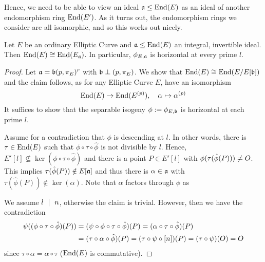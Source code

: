 Hence, we need to be able to view an ideal $\mathfrak{a} \leq \mathrm{End}(E)$ as an ideal of another endomorphism ring $\mathrm{End}(E')$.
As it turns out, the endomorphism rings we consider are all isomorphic, and so this works out nicely. 
\begin{lemma}
    Let $E$ be an ordinary Elliptic Curve and $\mathfrak{a} \leq \mathrm{End}(E)$ an integral, invertible ideal.
    Then $\mathrm{End}(E) \cong \mathrm{End}(E_{\mathfrak{a}})$.
    In particular, $\phi_{E, \mathfrak{a}}$ is horizontal at every prime $l$.
\end{lemma}
\begin{proof}
    Let $\mathfrak{a} = \mathfrak{b}(p, \pi_E)^r$ with $\mathfrak{b} \perp (p, \pi_E)$.
    We show that $\mathrm{End}(E) \cong \mathrm{End}(E/E[\mathfrak{b}])$ and the claim follows, as for any Elliptic Curve $E$, have an isomorphism
    \begin{equation*}
        \mathrm{End}(E) \to \mathrm{End}(E^{(p)}), \quad \alpha \mapsto \alpha^{(p)}
    \end{equation*}
    It suffices to show that the separable isogeny $\phi := \phi_{E, \mathfrak{b}}$ is horizontal at each prime $l$.

    Assume for a contradiction that $\phi$ is descending at $l$.
    In other words, there is $\tau \in \mathrm{End}(E)$ such that $\phi \circ \tau \circ \hat{\phi}$ is not divisible by $l$.
    Hence, $E'[l] \not\subseteq \ker(\phi \circ \tau \circ \hat{\phi})$ and there is a point $P \in E'[l]$ with $\phi(\tau(\hat{\phi}(P))) \neq O$.
    This implies $\tau(\hat{\phi}(P)) \notin E[\mathfrak{a}]$ and thus there is $\alpha \in \mathfrak{a}$ with $\tau(\hat{\phi}(P)) \notin \ker(\alpha)$.
    Note that $\alpha$ factors through $\phi$ as
    \begin{center}
    \end{center}
    We assume $l \ \mid \  n$, otherwise the claim is trivial.
    However, then we have the contradiction
    \begin{align*}
        \psi((\phi \circ \tau \circ \hat{\phi})(P)) &= (\psi \circ \phi \circ \tau \circ \hat{\phi})(P) = (\alpha \circ \tau \circ \hat{\phi})(P) \\
        &= (\tau \circ \alpha \circ \hat{\phi})(P) = (\tau \circ \psi \circ [n])(P) = (\tau \circ \psi)(O) = O
    \end{align*}
    since $\tau \circ \alpha = \alpha \circ \tau$ ($\mathrm{End}(E)$ is commutative).
\end{proof}
